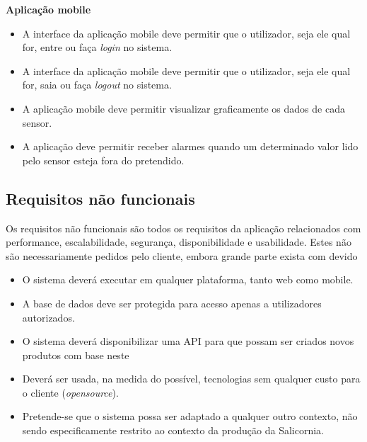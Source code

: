\textbf{Aplicação mobile}



\begin{itemize}
	\item A interface da aplicação mobile deve permitir que o utilizador, seja ele qual for, entre ou faça \textit{login} no sistema. 
	
	\item A interface da aplicação mobile deve permitir que o utilizador, seja ele qual for, saia ou faça \textit{logout} no sistema.
	
	
	\item A aplicação mobile deve permitir visualizar graficamente os dados de cada sensor. 
	
	\item  A aplicação deve permitir receber alarmes quando um determinado valor lido pelo sensor esteja fora do pretendido.
	
	
\end{itemize}



\subsection{Requisitos não funcionais}


Os requisitos não funcionais são todos os requisitos da aplicação relacionados com
performance, escalabilidade, segurança, disponibilidade e usabilidade. Estes não são necessariamente pedidos pelo cliente, embora grande parte exista com devido 


\begin{itemize}
	\item O sistema deverá executar em qualquer plataforma, tanto web como mobile. 
	
	
	\item A base de dados deve ser protegida para acesso apenas a utilizadores autorizados. 
		
	
	\item O sistema deverá disponibilizar uma API para que possam ser criados novos produtos com base neste 
	
	\item Deverá ser usada, na medida do possível, tecnologias sem qualquer custo para o cliente (\textit{opensource}). 
	
	\item Pretende-se que o sistema possa ser adaptado a qualquer outro contexto, não sendo especificamente restrito ao contexto da produção da Salicornia.  
		
\end{itemize}



